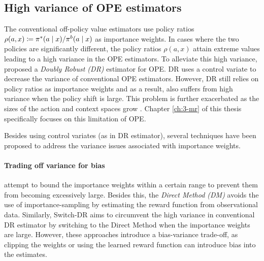 \subsection{High variance of OPE estimators}\label{subsec:high-variance}
The conventional off-policy value estimators use policy ratios $\rho(a, x) \coloneqq \pi^*(a\mid x)/\pi^b(a\mid x)$ as importance weights. 
In cases where the two policies are significantly different, the policy ratios $\rho(a, x)$ attain extreme values leading to a high variance in the OPE estimators. 
To alleviate this high variance, \cite{dudik2014doubly} proposed a \emph{Doubly Robust (DR)} estimator for OPE. 
DR uses a control variate to decrease the variance of conventional OPE estimators. 
However, DR still relies on policy ratios as importance weights and as a result, also suffers from high variance when the policy shift is large. 
This problem is further exacerbated as the sizes of the action and context spaces grow \citep{sachdeva2020off, saito2022off}.
Chapter \ref{ch:3-mr} of this thesis specifically focuses on this limitation of OPE. 

Besides using control variates (as in DR estimator), several techniques have been proposed to address the variance issues associated with importance weights. 

\paragraph{Trading off variance for bias}
\cite{swaminathan2015counterfactual, swaminathan2015the, chaudhuri2019london} attempt to bound the importance weights within a certain range to prevent them from becoming excessively large. 
Besides this, the \emph{Direct Method (DM)} \citep{Beygelzimer2008Offset} avoids the use of importance-sampling by estimating the reward function from observational data.
Similarly, Switch-DR \citep{wang2017optimal} aims to circumvent the high variance in conventional DR estimator by switching to the Direct Method when the importance weights are large.
However, these approaches introduce a bias-variance trade-off, as clipping the weights or using the learned reward function can introduce bias into the estimates. 


